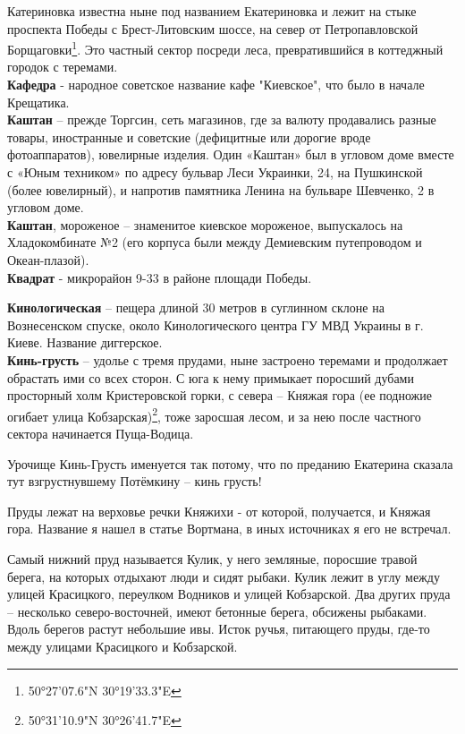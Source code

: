 Катериновка известна ныне под названием Екатериновка и лежит на стыке проспекта Победы с Брест-Литовским шоссе, на север от Петропавловской Борщаговки\footnote{50°27'07.6"N 30°19'33.3"E}. Это частный сектор посреди леса, превратившийся в коттеджный городок с теремами.\\

\textbf{Кафедра} - народное советское название кафе "Киевское", что было в начале Крещатика.\\

\textbf{Каштан} – прежде Торгсин, сеть магазинов, где за валюту продавались разные товары, иностранные и советские (дефицитные или дорогие вроде фотоаппаратов), ювелирные изделия. Один «Каштан» был в угловом доме вместе с «Юным техником» по адресу бульвар Леси Украинки, 24, на Пушкинской (более ювелирный), и напротив памятника Ленина на бульваре Шевченко, 2 в угловом доме.\\

\textbf{Каштан}, мороженое – знаменитое киевское мороженое, выпускалось на Хладокомбинате №2 (его корпуса были между Демиевским путепроводом и Океан-плазой).\\

\textbf{Квадрат} - микрорайон 9-33 в районе площади Победы.

\textbf{Кинологическая} – пещера длиной 30 метров в суглинном склоне на Вознесенском спуске, около Кинологического центра ГУ МВД Украины в г. Киеве. Название диггерское.\\

\textbf{Кинь-грусть} – удолье с тремя прудами, ныне застроено теремами и продолжает обрастать ими со всех сторон. С юга к нему примыкает поросший дубами просторный холм Кристеровской горки, с севера – Княжая гора (ее подножие огибает улица Кобзарская)\footnote{50°31'10.9"N 30°26'41.7"E}, тоже заросшая лесом, и за нею после частного сектора начинается Пуща-Водица. 

Урочище Кинь-Грусть именуется так потому, что по преданию Екатерина сказала тут взгрустнувшему Потёмкину – кинь грусть!

Пруды лежат на верховье речки Княжихи - от которой, получается, и Княжая гора. Название я нашел в статье Вортмана, в иных источниках я его не встречал. 

Самый нижний пруд называется Кулик, у него земляные, поросшие травой берега, на которых отдыхают люди и сидят рыбаки. Кулик лежит в углу между улицей Красицкого, переулком Водников и улицей Кобзарской. Два других пруда – несколько северо-восточней, имеют бетонные берега, обсижены рыбаками. Вдоль берегов растут небольшие ивы. Исток ручья, питающего пруды, где-то между улицами Красицкого и Кобзарской.

